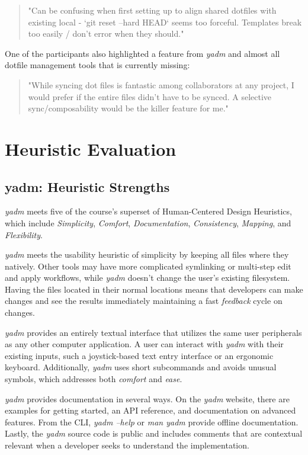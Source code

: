 \documentclass[letterpaper]{jdf}
\begin{document}
\begin{quotation}
	"Can be confusing when first setting up to align shared dotfiles with existing local - `git reset --hard HEAD` seems too forceful. Templates break too easily / don't error when they should."
\end{quotation}

One of the participants also highlighted a feature from \emph{yadm} and almost all dotfile management tools that is currently missing:

\begin{quotation}
	"While syncing dot files is fantastic among collaborators at any project, I would prefer if the entire files didn't have to be synced. A selective sync/composability would be the killer feature for me."
\end{quotation}

\section{Heuristic Evaluation}

\subsection{yadm: Heuristic Strengths}
\emph{yadm} meets five of the course's superset of Human-Centered Design  Heuristics, which include \emph{Simplicity}, \emph{Comfort}, \emph{Documentation}, \emph{Consistency}, \emph{Mapping}, and \emph{Flexibility}.

 \emph{yadm} meets the usability heuristic of simplicity by keeping all files where they natively. Other tools may have more complicated symlinking or multi-step edit and apply workflows, while \emph{yadm} doesn't change the user's existing filesystem. Having the files located in their normal locations means that developers can make changes and see the results immediately maintaining a fast \emph{feedback} cycle on changes.

 \emph{yadm} provides an entirely textual interface that utilizes the same user peripherals as any other computer application. A user can interact with \emph{yadm} with their existing inputs, such a joystick-based text entry interface or an ergonomic keyboard. Additionally, \emph{yadm} uses short subcommands and avoids unusual symbols, which addresses both \emph{comfort} and \emph{ease}.

 \emph{yadm} provides documentation in several ways. On the \emph{yadm} website, there are examples for getting started, an API reference, and documentation on advanced features. From the CLI, \emph{yadm --help} or \emph{man yadm} provide offline documentation. Lastly, the \emph{yadm} source code is public and includes comments that are contextual relevant when a developer seeks to understand the implementation.
\end{document}
